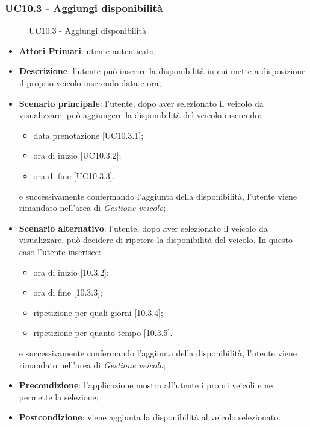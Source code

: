 \subsubsection{UC10.3 - Aggiungi disponibilità}
\begin{figure}[H]
	\centering
	\caption{UC10.3 - Aggiungi disponibilità}
\end{figure}
\begin{itemize}
	\item \textbf{Attori Primari}: utente autenticato;
	\item \textbf{Descrizione}: l'utente può inserire la disponibilità in cui mette a disposizione il proprio veicolo inserendo data e ora;
	\item \textbf{Scenario principale}: l'utente, dopo aver selezionato il veicolo da visualizzare, può aggiungere la disponibilità del veicolo inserendo:
	\begin{itemize}
		\item data prenotazione [UC10.3.1];
		\item ora di inizio [UC10.3.2];
		\item ora di fine [UC10.3.3].
	\end{itemize}
	e successivamente confermando l'aggiunta della disponibilità, l'utente viene rimandato nell'area di \textit{Gestione veicolo};
	\item \textbf{Scenario alternativo}: l'utente, dopo aver selezionato il veicolo da visualizzare, può decidere di ripetere la disponibilità del veicolo. In questo caso l'utente inserisce:
	\begin{itemize}
		\item ora di inizio [10.3.2];
		\item ora di fine [10.3.3];
		\item ripetizione per quali giorni [10.3.4];
		\item ripetizione per quanto tempo [10.3.5].
	\end{itemize}
	e successivamente confermando l'aggiunta della disponibilità, l'utente viene rimandato nell'area di \textit{Gestione veicolo};
	\item \textbf{Precondizione}: l'applicazione mostra all'utente i propri veicoli e ne permette la selezione;
	\item \textbf{Postcondizione}: viene aggiunta la disponibilità al veicolo selezionato.
\end{itemize}
